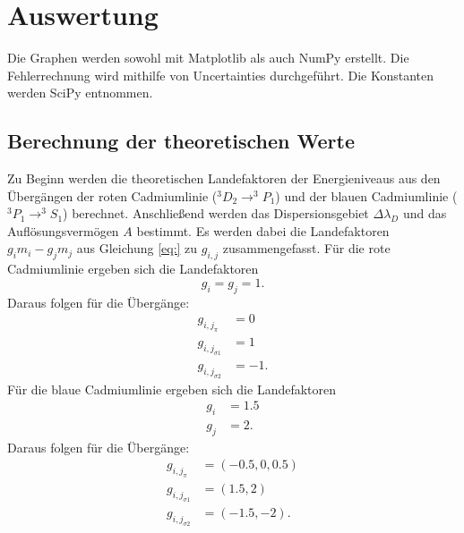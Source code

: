 \section{Auswertung}
\label{sec:Auswertung}

Die Graphen werden sowohl mit Matplotlib \cite{matplotlib} als auch NumPy \cite{numpy} erstellt. Die Fehlerrechnung wird mithilfe von Uncertainties \cite{uncertainties} durchgeführt. Die Konstanten werden SciPy \cite{scipy} entnommen.

\subsection{Berechnung der theoretischen Werte}

Zu Beginn werden die theoretischen Landefaktoren der Energieniveaus aus den Übergängen der roten Cadmiumlinie ($^3D_2 \rightarrow ^3P_1$) und der blauen Cadmiumlinie ($^3P_1 \rightarrow ^3S_1$) berechnet. 
Anschließend werden das Dispersionsgebiet $\Delta\lambda_D$ und das Auflösungsvermögen $A$ bestimmt.
Es werden dabei die Landefaktoren $g_im_i-g_jm_j$ aus Gleichung \ref{eq:} zu $g_{i,j}$ zusammengefasst.
Für die rote Cadmiumlinie ergeben sich die Landefaktoren
\[
g_i=g_j=1\text{.}
\]
Daraus folgen für die Übergänge:
\begin{align*}
g_{i,j_\pi}&=0\\
g_{i,j_{\sigma1}}&=1\\
g_{i,j_{\sigma2}}&=-1 \text{.}
\end{align*}
Für die blaue Cadmiumlinie ergeben sich die Landefaktoren
\begin{align*}
g_i &= 1.5\\
g_j &= 2 \text{.}
\end{align*}
Daraus folgen für die Übergänge:
\begin{align*}
g_{i,j_\pi}&=(-0.5,0,0.5)\\
g_{i,j_{\sigma1}}&=(1.5,2)\\
g_{i,j_{\sigma2}}&=(-1.5,-2) \text{.}
\end{align*}
